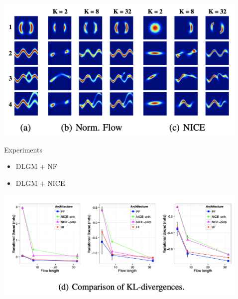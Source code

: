 \documentclass[final,hyperref={pdfpagelabels=false}]{beamer}
\begin{document}
\begin{frame}[t]
\begin{columns}[t]
\begin{column}{.3\textwidth}
     \begin{center}
        \includegraphics[width=0.9\columnwidth]{EFs}
      \end{center}
      
      \begin{block}{Experiments}
      \begin{itemize}
      	\item DLGM + NF
      	\item DLGM + NICE
      \end{itemize}
      
      \end{block}
      
      
	\begin{center}
        \includegraphics[width=0.9\columnwidth]{varbound}
      \end{center}

  \end{column} %
  


  \begin{column}{.02\textwidth}\end{column} %

  \begin{column}{.3\textwidth} %


\end{column}
\end{columns}
\end{frame}
\end{document}
